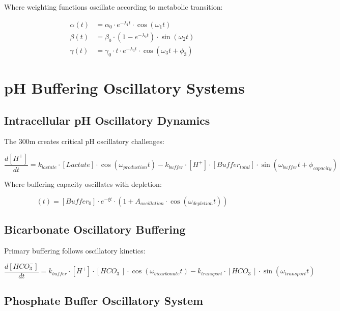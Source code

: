 \documentclass[12pt]{article}
\begin{document}
Where weighting functions oscillate according to metabolic transition:

\begin{align}
\alpha(t) &= \alpha_0 \cdot e^{-\lambda_1 t} \cdot \cos(\omega_1 t) \\
\beta(t) &= \beta_0 \cdot (1 - e^{-\lambda_2 t}) \cdot \sin(\omega_2 t) \\
\gamma(t) &= \gamma_0 \cdot t \cdot e^{-\lambda_3 t} \cdot \cos(\omega_3 t + \phi_3)
\end{align}

\section{pH Buffering Oscillatory Systems}

\subsection{Intracellular pH Oscillatory Dynamics}

The 300m creates critical pH oscillatory challenges:

\begin{equation}
\frac{d[H^+]}{dt} = k_{lactate} \cdot [Lactate] \cdot \cos(\omega_{production}t) - k_{buffer} \cdot [H^+] \cdot [Buffer_{total}] \cdot \sin(\omega_{buffer}t + \phi_{capacity})
\end{equation}

Where buffering capacity oscillates with depletion:

\begin{equation}
[Buffer_{total}](t) = [Buffer_0] \cdot e^{-\xi t} \cdot \left(1 + A_{oscillation} \cdot \cos(\omega_{depletion}t)\right)
\end{equation}

\subsection{Bicarbonate Oscillatory Buffering}

Primary buffering follows oscillatory kinetics:

\begin{equation}
\frac{d[HCO_3^-]}{dt} = k_{buffer} \cdot [H^+] \cdot [HCO_3^-] \cdot \cos(\omega_{bicarbonate}t) - k_{transport} \cdot [HCO_3^-] \cdot \sin(\omega_{transport}t)
\end{equation}

\subsection{Phosphate Buffer Oscillatory System}
\end{document}
